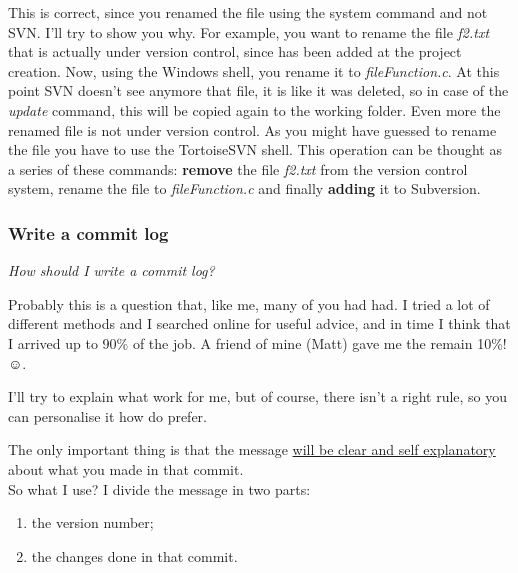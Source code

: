 This is correct, since you renamed the file using the system command and not SVN. I'll try to show you why.
For example, you want to rename the file \textit{f2.txt} that is actually under version control, since has been added at the project creation. Now, using the Windows shell, you rename it to \textit{fileFunction.c}. At this point SVN doesn't see anymore that file, it is like it was deleted, so in case of the \textit{update} command, this will be copied again to the working folder. Even more the renamed file is not under version control. As you might have guessed to rename the file you have to use the TortoiseSVN shell. This operation can be thought as a series of these commands: \textbf{remove} the file \textit{f2.txt} from the version control system, rename the file to \textit{fileFunction.c} and finally \textbf{adding} it to Subversion.










\subsubsection{Write a commit log}
\label{subsubsectio:HowWriteRevision}


\textit{How should I write a commit log?}\newline

Probably this is a question that, like me, many of you had had. I tried a lot of different methods and I searched online for useful advice, and in time I think that I arrived up to 90\% of the job. A friend of mine (Matt) gave me the remain 10\%! $\smileface$.

I'll try to explain what work for me, but of course, there isn't a right rule, so you can personalise it how do prefer.

The only important thing is that the message \underline{will be clear and self explanatory} about what you made in that commit.\\

So what I use? I divide the message in two parts: 

\begin{enumerate}

    \item the version number;
    
    \item the changes done in that commit.
    
\end{enumerate}


